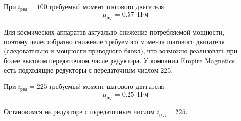 При $i_\text{ред} = 100$ требуемый момент шагового двигателя
$$
    \mu_\textit{шд} = 0.57 \text{ Н$\cdot$м}
$$

Для космических аппаратов актуально снижение потребляемой мощности, поэтому
целесообразно снижение требуемого момента шагового двигателя
(следовательно и мощности приводного блока), что возможно реализовать при более
высоком передаточном числе редуктора. У компании Empire Magnetics есть подходящие
редукторы с передаточным числом 225.

При $i_\text{ред} = 225$ требуемый момент шагового двигателя
$$
    \mu_\textit{шд} = 0.25 \text{ Н$\cdot$м}
$$

Остановимся на редукторе с передаточным числом $i_\text{ред} = 225$.
